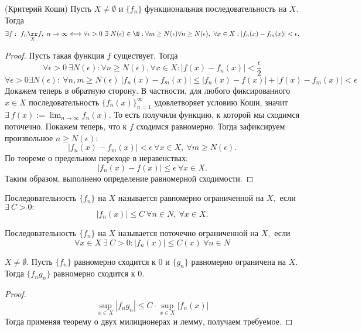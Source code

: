 \begin{theorem}
    (Критерий Коши) Пусть $X \neq \emptyset$ и $\{f_n\}$ функциональная последовательность на $X.$ Тогда 
    $$\exists f: \ f_n \underset{X}{\rr} f, \ n\rightarrow \infty \Longleftrightarrow 
    \forall \epsilon > 0 \ \exists \ N(\epsilon) \in \N: \forall m \geq N(\epsilon) \forall n \geq N(\epsilon), \ \forall x \in X: |f_n(x) - f_m(x)| < \epsilon.$$
\end{theorem}

\begin{proof}
    Пусть такая функция $f$ существует. Тогда 
    $$\forall \epsilon > 0 \ \exists N(\epsilon): \forall n \geq N(\epsilon), \forall x \in X: |f(x) - f_n(x)| < \frac{\epsilon}{2}$$
    $$\forall \epsilon > 0 \exists N(\epsilon): \ \forall n, m \geq N(\epsilon) \ |f_n(x) - f_m(x)| \leq |f_n(x) - f(x)| + |f(x) - f_m(x)| < \epsilon$$
    Докажем теперь в обратную сторону. В частности, для любого фиксированного $x \in X$ последовательность $\{f_n(x)\}_{n = 1}^{\infty}$ удовлетворяет условию Коши, значит $\exists \ f(x) := \lim_{n \rightarrow \infty} f_n(x).$ То есть получили функцию, к которой мы сходимся поточечно. Покажем теперь, что к $f$ сходимся равномерно. Тогда зафиксируем произвольное $n \geq N(\epsilon):$
    $$|f_n(x) - f_m(x)| < \epsilon \ \forall x \in X, \ \forall m \geq N(\epsilon).$$
    По теореме о предельном переходе в неравенствах:
    $$|f_n(x) - f(x)| \leq \epsilon \ \forall x \in X.$$
    Таким образом, выполнено определение равномерной сходимости.
\end{proof}

\begin{definition}
    Последовательность $\{f_n\}$ на $X$ называется равномерно ограниченной на $X,$ если $\exists \ C > 0:$
    $$|f_n(x)| \leq C \ \forall n \in N, \ \forall x \in X.$$
\end{definition}

\begin{definition}
    Последовательность $\{f_n\}$ на $X$ называется поточечно ограниченной на $X,$ если 
    $$\forall x \in X \ \exists \  C > 0: |f_n(x)| \leq C(x) \ \forall n \in N$$
\end{definition}

\begin{lemma}
    $X \neq \emptyset.$ Пусть $\{f_n\}$ равномерно сходится к $0$ и $\{g_n\}$ равномерно ограничена на $X.$ Тогда $\{f_n g_n\}$ равномерно сходится к $0.$
\end{lemma}

\begin{proof}
    $$\sup\limits_{x\in X} |f_n g_n| \leq C \cdot \sup\limits_{x\in X}|f_n(x)|$$
    Тогда применяя теорему о двух милиционерах и лемму, получаем требуемое.
\end{proof}

